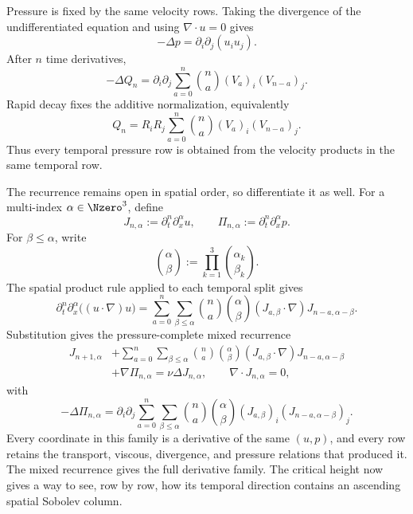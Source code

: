 Pressure is fixed by the same velocity rows.
Taking the divergence of the undifferentiated equation and using \(\nabla\cdot u=0\) gives
\[
  -\Delta p
  =
  \partial_i\partial_j(u_i u_j).
\]
After \(n\) time derivatives,
\[
  -\Delta Q_n
  =
  \partial_i\partial_j
  \sum_{a=0}^{n}
  \binom{n}{a}
  (V_a)_i(V_{n-a})_j.
\]
Rapid decay fixes the additive normalization, equivalently
\[
  Q_n
  =
  R_iR_j
  \sum_{a=0}^{n}
  \binom{n}{a}
  (V_a)_i(V_{n-a})_j.
\]
Thus every temporal pressure row is obtained from the velocity products in the same temporal row.

The recurrence remains open in spatial order, so differentiate it as well.
For a multi-index \(\alpha\in\Nzero^3\), define
\[
  J_{n,\alpha}
  :=
  \partial_t^n\partial_x^\alpha u,
  \qquad
  \Pi_{n,\alpha}
  :=
  \partial_t^n\partial_x^\alpha p.
\]
For \(\beta\leq\alpha\), write
\[
  \binom{\alpha}{\beta}
  :=
  \prod_{k=1}^{3}
  \binom{\alpha_k}{\beta_k}.
\]
The spatial product rule applied to each temporal split gives
\[
  \partial_t^n\partial_x^\alpha
  \bigl((u\cdot\nabla)u\bigr)
  =
  \sum_{a=0}^{n}
  \sum_{\beta\leq\alpha}
  \binom{n}{a}
  \binom{\alpha}{\beta}
  (J_{a,\beta}\cdot\nabla)
  J_{n-a,\alpha-\beta}.
\]
Substitution gives the pressure-complete mixed recurrence
\begin{align*}
  J_{n+1,\alpha}
  &+
  \sum_{a=0}^{n}
  \sum_{\beta\leq\alpha}
  \binom{n}{a}
  \binom{\alpha}{\beta}
  (J_{a,\beta}\cdot\nabla)
  J_{n-a,\alpha-\beta}
  \\
  &+
  \nabla\Pi_{n,\alpha}
  =
  \nu\Delta J_{n,\alpha},
  \qquad
  \nabla\cdot J_{n,\alpha}=0,
\end{align*}
with
\[
  -\Delta\Pi_{n,\alpha}
  =
  \partial_i\partial_j
  \sum_{a=0}^{n}
  \sum_{\beta\leq\alpha}
  \binom{n}{a}
  \binom{\alpha}{\beta}
  (J_{a,\beta})_i
  (J_{n-a,\alpha-\beta})_j.
\]
Every coordinate in this family is a derivative of the same \((u,p)\), and every row retains the transport, viscous, divergence, and pressure relations that produced it.
The mixed recurrence gives the full derivative family.
The critical height now gives a way to see, row by row, how its temporal direction contains an ascending spatial Sobolev column.
